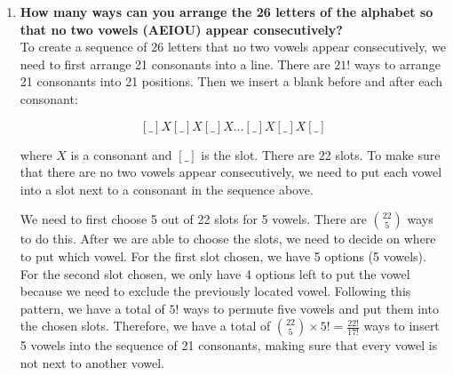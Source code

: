 \documentclass[10pt]{article}
\begin{document}
\begin{enumerate}
\begin{enumerate}
After this step, the $i^{th}$ ($1 \leq i \leq 4$) Ole already has $k_i$ pizzas $(0 \leq k_i \leq 3)$, and we need to distribute $3 - k_i$ identical cookies to this Ole and make sure that the number of cookies we have is sufficient to do this. Since the cookies are identical, we don't need to care about which cookie will be distributed to which student. And we are sure that we have enough cookies to do that ($\sum\limits_{i=1}^{4}(3-k_i) = 12 -3 = 9$). Thus, there is only one way to distribute 9 identical cookies to the students based on the number of food items they already have, so each of them will have three items in total at the end.

Therefore, the number of ways to distribute three different pizzas and nine identical cookies to four hungry Oles so that everyone receives a total of three food items is $64 \times 1 = 64$.
 
\end{enumerate}

 pt

\item
\textbf{How many ways can you arrange the 26 letters of the alphabet so that no two vowels (AEIOU) appear consecutively?}\\

To create a sequence of 26 letters that no two vowels appear consecutively, we need to first arrange 21 consonants into a line. There are $21!$ ways to arrange 21 consonants into 21 positions. Then we insert a blank before and after each consonant:

$$[\_]X[\_]X[\_]X\ldots[\_]X[\_]X[\_]$$

where $X$ is a consonant and $[\_]$ is the slot. There are 22 slots. To make sure that there are no two vowels appear consecutively, we need to put each vowel into a slot next to a consonant in the sequence above.

We need to first choose 5 out of 22 slots for 5 vowels. There are $\binom{22}{5}$ ways to do this. After we are able to choose the slots, we need to decide on where to put which vowel. For the first slot chosen, we have 5 options (5 vowels). For the second slot chosen, we only have 4 options left to put the vowel because we need to exclude the previously located vowel. Following this pattern, we have a total of $5!$ ways to permute five vowels and put them into the chosen slots. Therefore, we have a total of $\binom{22}{5} \times 5! = \frac{22!}{17!}$ ways to insert 5 vowels into the sequence of 21 consonants, making sure that every vowel is not next to another vowel.


\end{enumerate}
\end{document}
